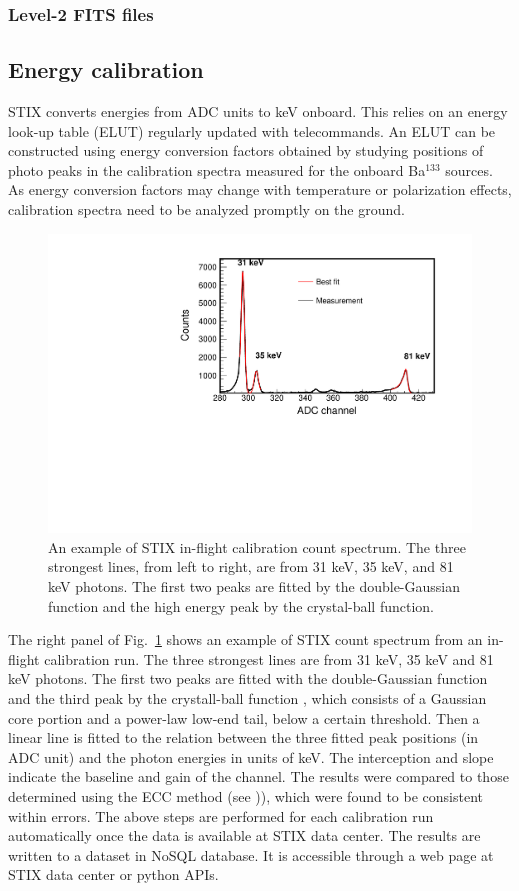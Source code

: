 \documentclass[referee]{aa} %
\begin{document}
\subsubsection{Level-2 FITS files}


\subsection{Energy calibration}
STIX converts energies from ADC units to keV onboard. This relies on
an energy look-up table (ELUT) regularly updated  with telecommands.
An ELUT can be constructed using energy conversion factors obtained by studying
 positions of photo peaks in the calibration spectra measured for the onboard Ba$^{133}$ sources.  
 As energy conversion factors may change with temperature 
 or polarization effects,  calibration spectra need to be analyzed promptly on the ground. 


\begin{figure}
 \centering
  \includegraphics[width=0.8\linewidth]{figures/cal-fit.pdf}
  \caption{An example of STIX in-flight calibration count spectrum.
  The three strongest lines, from left to right, are from 31 keV, 35 keV, and 81 keV
  photons. The first two peaks are fitted by the double-Gaussian function and the high energy peak by  
  the crystal-ball function. }
    \label{fig:cal-fit}
\end{figure}
The right panel of Fig.~\ref{fig:cal-fit} shows 
an example of STIX count spectrum from an in-flight calibration run.  
The three strongest lines are from 31 keV, 35 keV and 81 keV photons. 
The first two peaks are fitted with the double-Gaussian function and the third peak
by the crystall-ball function \cite{crsystallball},  which consists of a Gaussian core portion 
and a power-law low-end tail, below a certain threshold.
Then a linear line is fitted to the relation between
the three fitted peak positions (in ADC unit) and the photon energies in units of keV.  
The interception and slope indicate the baseline and gain of the channel. 
The results were compared to those determined using the ECC method (see \cite{ecc,ecc2})), 
 which were found to be consistent within errors.
The above steps are performed for each calibration run automatically 
once the data is available at STIX data center.  The results are written to a
 dataset in  NoSQL database.  It is accessible through a web page at STIX data center or python APIs.
\end{document}
